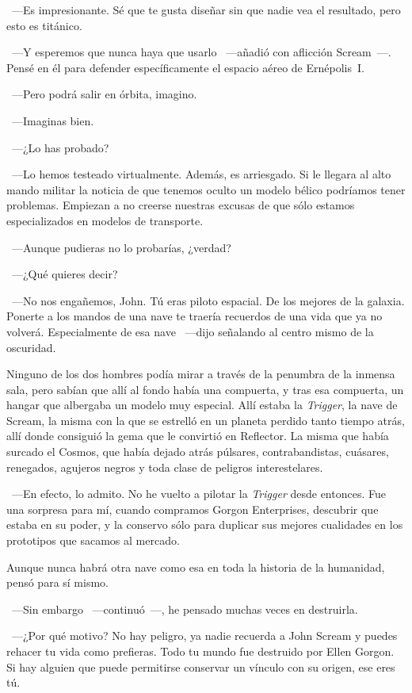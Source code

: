 ~---Es impresionante. Sé que te gusta diseñar sin que nadie vea el resultado, pero esto es titánico.

~---Y esperemos que nunca haya que usarlo ~---añadió con aflicción Scream~---. Pensé en él para defender específicamente el espacio aéreo de Ernépolis~I.

~---Pero podrá salir en órbita, imagino.

~---Imaginas bien.

~---¿Lo has probado?

~---Lo hemos testeado virtualmente. Además, es arriesgado. Si le llegara al alto mando militar la noticia de que tenemos oculto un modelo bélico podríamos tener problemas. Empiezan a no creerse nuestras excusas de que sólo estamos especializados en modelos de transporte.

~---Aunque pudieras no lo probarías, ¿verdad?

~---¿Qué quieres decir?

~---No nos engañemos, John. Tú eras piloto espacial. De los mejores de la galaxia. Ponerte a los mandos de una nave te traería recuerdos de una vida que ya no volverá. Especialmente de esa nave ~---dijo señalando al centro mismo de la oscuridad.

Ninguno de los dos hombres podía mirar a través de la penumbra de la inmensa sala, pero sabían que allí al fondo había una compuerta, y tras esa compuerta, un hangar que albergaba un modelo muy especial. Allí estaba la \emph{Trigger}, la nave de Scream, la misma con la que se estrelló en un planeta perdido tanto tiempo atrás, allí donde consiguió la gema que le convirtió en Reflector. La misma que había surcado el Cosmos, que había dejado atrás púlsares, contrabandistas, cuásares, renegados, agujeros negros y toda clase de peligros interestelares.

~---En efecto, lo admito. No he vuelto a pilotar la \emph{Trigger} desde entonces. Fue una sorpresa para mí, cuando compramos Gorgon Enterprises, descubrir que estaba en su poder, y la conservo sólo para duplicar sus mejores cualidades en los prototipos que sacamos al mercado.

Aunque nunca habrá otra nave como esa en toda la historia de la humanidad, pensó para sí mismo.

~---Sin embargo ~---continuó~---, he pensado muchas veces en destruirla.

~---¿Por qué motivo? No hay peligro, ya nadie recuerda a John Scream y puedes rehacer tu vida como prefieras. Todo tu mundo fue destruido por Ellen Gorgon. Si hay alguien que puede permitirse conservar un vínculo con su origen, ese eres tú.

